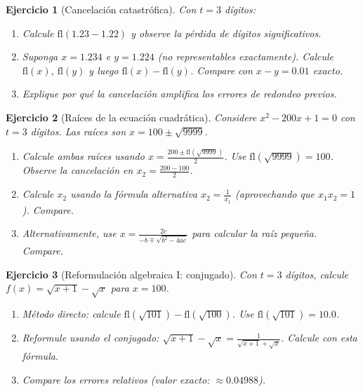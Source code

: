\documentclass[12pt]{article}
\newtheorem{exercise}{Ejercicio}
\begin{document}
\begin{exercise}[Cancelación catastrófica]
Con $t = 3$ dígitos:
\begin{enumerate}
\item Calcule $\text{fl}(1.23 - 1.22)$ y observe la pérdida de dígitos significativos.
\item Suponga $x = 1.234$ e $y = 1.224$ (no representables exactamente). Calcule $\text{fl}(x)$, $\text{fl}(y)$ y luego $\text{fl}(x) - \text{fl}(y)$. Compare con $x - y = 0.01$ exacto.
\item Explique por qué la cancelación amplifica los errores de redondeo previos.
\end{enumerate}
\end{exercise}

\begin{exercise}[Raíces de la ecuación cuadrática]
Considere $x^2 - 200x + 1 = 0$ con $t = 3$ dígitos. Las raíces son $x = 100 \pm \sqrt{9999}$.
\begin{enumerate}
\item Calcule ambas raíces usando $x = \frac{200 \pm \text{fl}(\sqrt{9999})}{2}$. Use $\text{fl}(\sqrt{9999}) = 100$. Observe la cancelación en $x_2 = \frac{200 - 100}{2}$.
\item Calcule $x_2$ usando la fórmula alternativa $x_2 = \frac{1}{x_1}$ (aprovechando que $x_1 x_2 = 1$). Compare.
\item Alternativamente, use $x = \frac{2c}{-b \mp \sqrt{b^2-4ac}}$ para calcular la raíz pequeña. Compare.
\end{enumerate}
\end{exercise}

\begin{exercise}[Reformulación algebraica I: conjugado]
Con $t = 3$ dígitos, calcule $f(x) = \sqrt{x+1} - \sqrt{x}$ para $x = 100$.
\begin{enumerate}
\item Método directo: calcule $\text{fl}(\sqrt{101}) - \text{fl}(\sqrt{100})$. Use $\text{fl}(\sqrt{101}) = 10.0$.
\item Reformule usando el conjugado: $\sqrt{x+1} - \sqrt{x} = \frac{1}{\sqrt{x+1} + \sqrt{x}}$. Calcule con esta fórmula.
\item Compare los errores relativos (valor exacto: $\approx 0.04988$).
\end{enumerate}
\end{exercise}
\end{document}
